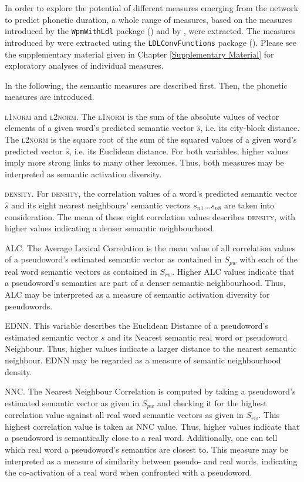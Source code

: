 In order to explore the potential of different measures emerging from the network to predict phonetic duration, a whole range of measures, based on the measures introduced by the \texttt{WpmWithLdl} package (\cite{Baayen2019wpm}) and by \citet{Chuang2021}, were extracted. The measures introduced by \citet{Chuang2021} were extracted using the \texttt{LDLConvFunctions} package (\cite{Schmitz2021ldlconv}). Please see the supplementary material given in Chapter \ref{Supplementary Material} for exploratory analyses of individual measures.

In the following, the semantic measures are described first. Then, the phonetic measures are introduced.

\textsc{l1norm} and \textsc{l2norm}. The \textsc{l1norm} is the sum of the absolute values of vector elements of a given word’s predicted semantic vector $\hat{s}$, i.e. its city-block distance. The \textsc{l2norm} is the square root of the sum of the squared values of a given word’s predicted vector $\hat{s}$, i.e. its Euclidean distance. For both variables, higher values imply more strong links to many other lexomes. Thus, both measures may be interpreted as semantic activation diversity.

\textsc{density}. For \textsc{density}, the correlation values of a word’s predicted semantic vector $\hat{s}$ and its eight nearest neighbours’ semantic vectors $s_{n1}...s_{n8}$ are taken into consideration. The mean of these eight correlation values describes \textsc{density}, with higher values indicating a denser semantic neighbourhood.

\textsc{ALC}. The Average Lexical Correlation is the mean value of all correlation values of a pseudoword’s estimated semantic vector as contained in $S_{pw}$ with each of the real word semantic vectors as contained in $S_{rw}$. Higher \textsc{ALC} values indicate that a pseudoword’s semantics are part of a denser semantic neighbourhood. Thus, \textsc{ALC} may be interpreted as a measure of semantic activation diversity for pseudowords.

\textsc{EDNN}. This variable describes the Euclidean Distance of a pseudoword’s estimated semantic vector $s$ and its Nearest semantic real word or pseudoword Neighbour. Thus, higher values indicate a larger distance to the nearest semantic neighbour. \textsc{EDNN} may be regarded as a measure of semantic neighbourhood density.

\textsc{NNC}. The Nearest Neighbour Correlation is computed by taking a pseudoword’s estimated semantic vector as given in $S_{pw}$ and checking it for the highest correlation value against all real word semantic vectors as given in $S_{rw}$. This highest correlation value is taken as \textsc{NNC} value. Thus, higher values indicate that a pseudoword is semantically close to a real word. Additionally, one can tell which real word a pseudoword’s semantics are closest to. This measure may be interpreted as a measure of similarity between pseudo- and real words, indicating the co-activation of a real word when confronted with a pseudoword. 

